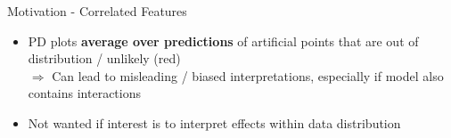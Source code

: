 \documentclass[11pt,compress,t,notes=noshow, aspectratio=169, xcolor=table]{beamer}
\begin{document}
\begin{frame}{Motivation - Correlated Features}
\begin{itemize}
    \item PD plots \textbf{average over predictions} of artificial points that are out of distribution / unlikely (red)\\
    $\Rightarrow$ Can lead to misleading / biased interpretations, especially if model also contains interactions
    \item Not wanted if interest is to interpret effects within data distribution
\end{itemize}



\end{frame}
\end{document}
